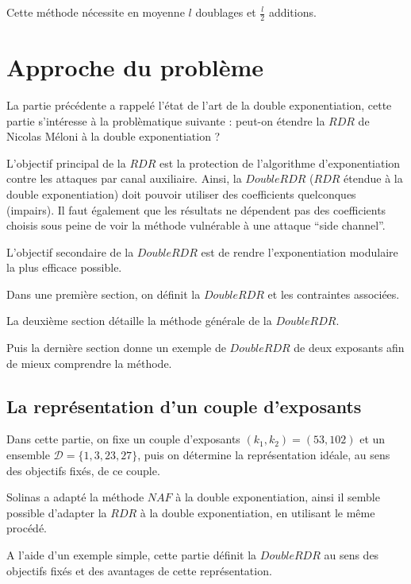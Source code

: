 \documentclass[12pt, a4paper]{memoir}
\newcommand{\doublezero}{\begin{pmatrix} 0 \\ 0 \end{pmatrix}}
\begin{document}
  Cette méthode nécessite en moyenne $l$ doublages et $\frac{l}{2}$ additions.
  
\chapter{Approche du problème}

La partie précédente a rappelé l'état de l'art de la double exponentiation, cette partie s'intéresse à la 
problèmatique suivante : peut-on étendre la $RDR$ de Nicolas Méloni à la double exponentiation ?

L'objectif principal de la $RDR$ est la protection de l'algorithme d'exponentiation contre les attaques 
par canal auxiliaire. Ainsi, la $DoubleRDR$ ($RDR$ étendue à la double exponentiation) doit pouvoir utiliser des
coefficients quelconques (impairs). Il faut également que les résultats ne dépendent pas des coefficients 
choisis sous peine de voir la méthode vulnérable à une attaque ``side channel''.

L'objectif secondaire de la $DoubleRDR$ est de rendre l'exponentiation modulaire la plus efficace possible.

Dans une première section, on définit la $DoubleRDR$ et les contraintes associées.

La deuxième section détaille la méthode générale de la $DoubleRDR$.

Puis la dernière section donne un exemple de $DoubleRDR$ de deux exposants afin de mieux comprendre la méthode.

\section{La représentation d'un couple d'exposants}

Dans cette partie, on fixe un couple d'exposants $(k_1,k_2) = (53,102)$ et un ensemble $\mathcal{D} = \{1,3,23,27\}$,
puis on détermine la représentation idéale, au sens des objectifs fixés, de ce couple.

Solinas a adapté la méthode $NAF$ à la double exponentiation, ainsi il semble possible d'adapter la $RDR$
à la double exponentiation, en utilisant le même procédé.

A l'aide d'un exemple simple, cette partie définit la $DoubleRDR$ au sens des objectifs fixés et des avantages
de cette représentation.

\end{document}
